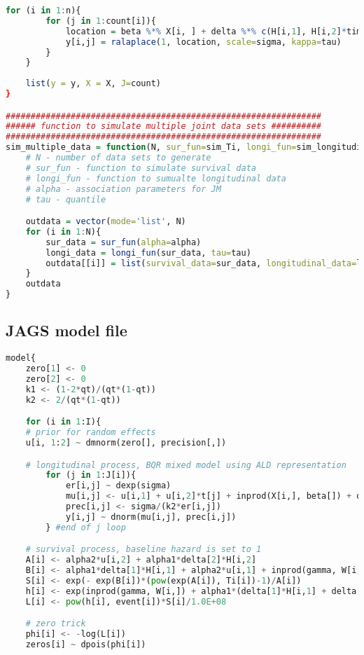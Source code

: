 \begin{appendices}
\begin{lstlisting}[language=R]
	for (i in 1:n){
		for (j in 1:count[i]){
			location = beta %*% X[i, ] + delta %*% c(H[i,1], H[i,2]*time[j]) + U[i,] %*% c(1, time[j])
			y[i,j] = ralaplace(1, location, scale=sigma, kappa=tau)		
		}	
	}
	
	list(y = y, X = X, J=count)		
}

###############################################################
###### function to simulate multiple joint data sets ##########
###############################################################
sim_multiple_data = function(N, sur_fun=sim_Ti, longi_fun=sim_longitudinal_data, alpha, tau){
	# N - number of data sets to generate
	# sur_fun - function to simulate survival data
	# longi_fun - function to sumualte longitudinal data
	# alpha - association parameters for JM
	# tau - quantile

	outdata = vector(mode='list', N)
	for (i in 1:N){
		sur_data = sur_fun(alpha=alpha)
		longi_data = longi_fun(sur_data, tau=tau)
		outdata[[i]] = list(survival_data=sur_data, longitudinal_data=longi_data)		
	}
	outdata	
}

\end{lstlisting}





\subsection{JAGS model file}
\begin{lstlisting}[language=python]
model{
	zero[1] <- 0
	zero[2] <- 0
	k1 <- (1-2*qt)/(qt*(1-qt))
	k2 <- 2/(qt*(1-qt))

	for (i in 1:I){
	# prior for random effects
	u[i, 1:2] ~ dmnorm(zero[], precision[,])

	# longitudinal process, BQR mixed model using ALD representation
		for (j in 1:J[i]){
			er[i,j] ~ dexp(sigma)
			mu[i,j] <- u[i,1] + u[i,2]*t[j] + inprod(X[i,], beta[]) + delta[1]*H[i,1] + delta[2]*H[i,2]*t[j] + k1*er[i,j]
			prec[i,j] <- sigma/(k2*er[i,j])
			y[i,j] ~ dnorm(mu[i,j], prec[i,j])
		} #end of j loop		

	# survival process, baseline hazard is set to 1
	A[i] <- alpha2*u[i,2] + alpha1*delta[2]*H[i,2]
	B[i] <- alpha1*delta[1]*H[i,1] + alpha2*u[i,1] + inprod(gamma, W[i,])
	S[i] <- exp(- exp(B[i])*(pow(exp(A[i]), Ti[i])-1)/A[i])
	h[i] <- exp(inprod(gamma, W[i,]) + alpha1*(delta[1]*H[i,1] + delta[2]*H[i,2]*Ti[i]) + alpha2*(u[i,1] + u[i,2]*Ti[i]))
	L[i] <- pow(h[i], event[i])*S[i]/1.0E+08

	# zero trick
	phi[i] <- -log(L[i])
	zeros[i] ~ dpois(phi[i])


\end{lstlisting}
\end{appendices}
